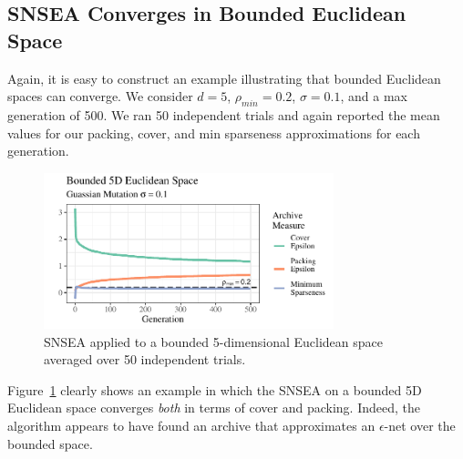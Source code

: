 \documentclass[twoside]{article}
\begin{document}
\subsection{SNSEA Converges in Bounded Euclidean Space}
\label{subsec:bounded}
Again, it is easy to construct an example illustrating that bounded Euclidean spaces can converge.  We consider $d=5$, $\rho_{min} = 0.2$, $\sigma=0.1$, and a max generation of 500.  We ran 50 independent trials and again reported the mean values for our packing, cover, and min sparseness approximations for each generation.  
\begin{figure}[h]
  \center\includegraphics[width=0.75\textwidth]{Figures/bounded-s01-r02-NOPOP.pdf}
  \caption{\label{fig:bounded:nopop:0103} SNSEA applied to a bounded 5-dimensional Euclidean space averaged over 50 independent trials.}
\end{figure}
%
Figure~\ref{fig:bounded:nopop:0103} clearly shows an example in which the SNSEA on a bounded 5D Euclidean space converges \emph{both} in terms of cover and packing.  Indeed, the algorithm appears to have found an archive that approximates an $\epsilon$-net over the bounded space.  
\end{document}
